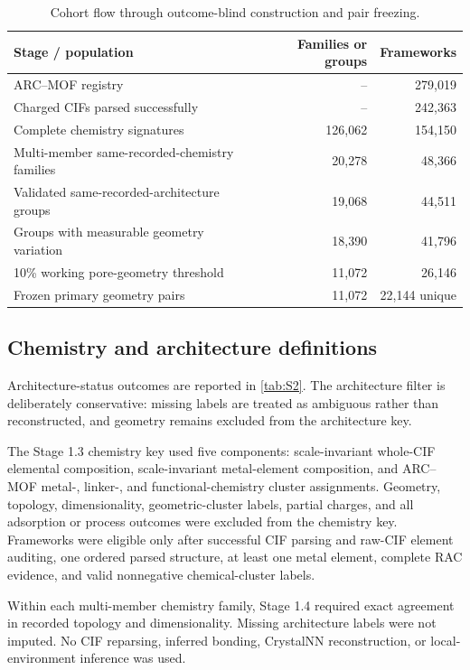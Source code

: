 \documentclass[11pt,a4paper]{article}
\begin{document}
\begin{table}[H]
\centering
\caption{Cohort flow through outcome-blind construction and pair freezing.}
\label{tab:S1}
\begin{tabularx}{\textwidth}{Xrr}
\toprule
Stage / population & Families or groups & Frameworks \\
\midrule
ARC--MOF registry & -- & 279,019 \\
Charged CIFs parsed successfully & -- & 242,363 \\
Complete chemistry signatures & 126,062 & 154,150 \\
Multi-member same-recorded-chemistry families & 20,278 & 48,366 \\
Validated same-recorded-architecture groups & 19,068 & 44,511 \\
Groups with measurable geometry variation & 18,390 & 41,796 \\
10\% working pore-geometry threshold & 11,072 & 26,146 \\
Frozen primary geometry pairs & 11,072 & 22,144 unique \\
\bottomrule
\end{tabularx}
\end{table}

\subsection{Chemistry and architecture definitions}

Architecture-status outcomes are reported in \cref{tab:S2}. The architecture filter is deliberately conservative: missing labels are treated as ambiguous rather than reconstructed, and geometry remains excluded from the architecture key.


The Stage 1.3 chemistry key used five components: scale-invariant whole-CIF
elemental composition, scale-invariant metal-element composition, and ARC--MOF
metal-, linker-, and functional-chemistry cluster assignments. Geometry, topology,
dimensionality, geometric-cluster labels, partial charges, and all adsorption or
process outcomes were excluded from the chemistry key. Frameworks were eligible
only after successful CIF parsing and raw-CIF element auditing, one ordered parsed
structure, at least one metal element, complete RAC evidence, and valid nonnegative
chemical-cluster labels.

Within each multi-member chemistry family, Stage 1.4 required exact agreement in
recorded topology and dimensionality. Missing architecture labels were not imputed.
No CIF reparsing, inferred bonding, CrystalNN reconstruction, or local-environment
inference was used.
\end{document}
